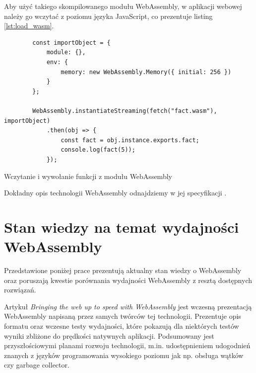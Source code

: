 \documentclass[language=polish,type=master]{aghmodern}
\begin{document}
Aby użyć takiego skompilowanego modułu WebAssembly, w aplikacji webowej należy go wczytać z poziomu języka JavaScript, co prezentuje listing \ref{lst:load_wasm}.

\begin{listing}[H]
    \begin{verbatim}
        const importObject = {
            module: {},
            env: {
                memory: new WebAssembly.Memory({ initial: 256 })
            }
        };

        WebAssembly.instantiateStreaming(fetch("fact.wasm"), importObject)
            .then(obj => {
                const fact = obj.instance.exports.fact;
                console.log(fact(5));
            });
    \end{verbatim}
    \caption{Wczytanie i wywołanie funkcji z modułu WebAssembly}
    \label{lst:load_wasm}
\end{listing}

Dokładny opis technologii WebAssembly odnajdziemy w jej specyfikacji \cite{wasm_specification}.

\section{Stan wiedzy na temat wydajności WebAssembly}
Przedstawione poniżej prace prezentują aktualny stan wiedzy o WebAssembly oraz poruszają kwestie porównania wydajności WebAssembly z resztą dostępnych rozwiązań.

Artykuł \cite{wasm} \emph{Bringing the web up to speed with WebAssembly} jest wczesną prezentacją WebAssembly napisaną przez samych twórców tej technologii.
Prezentuje opis formatu oraz wczesne testy wydajności, które pokazują dla niektórych testów wyniki zbliżone do prędkości natywnych aplikacji.
Podsumowany jest przyszłościowymi planami rozwoju technologii, m.in. udostępnieniem udogodnień znanych z języków programowania wysokiego poziomu jak np. obsługa wątków czy garbage collector\footnotemark{}.
\end{document}
